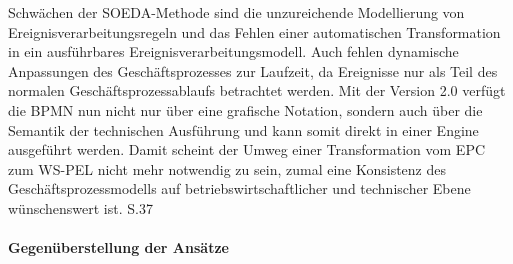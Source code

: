 Schwächen der SOEDA-Methode sind die unzureichende Modellierung von Ereignisverarbeitungsregeln und das Fehlen einer automatischen Transformation in ein ausführbares Ereignisverarbeitungsmodell. Auch fehlen dynamische Anpassungen des Geschäftsprozesses zur Laufzeit, da Ereignisse nur als Teil des normalen Geschäftsprozessablaufs betrachtet werden. Mit der Version 2.0 verfügt die BPMN nun nicht nur über eine grafische Notation, sondern auch über die Semantik der technischen Ausführung und kann somit direkt in einer Engine ausgeführt werden. Damit scheint der Umweg einer Transformation vom EPC zum WS-PEL nicht mehr notwendig zu sein, zumal eine Konsistenz des Geschäftsprozessmodells auf betriebswirtschaftlicher und technischer Ebene wünschenswert ist.
\cite{MatthiasWieland.2009} 
\cite{Bruns.2010}S.37
\cite{RobraBissantz.2009}




\paragraph{Gegenüberstellung der Ansätze}

\todo{}